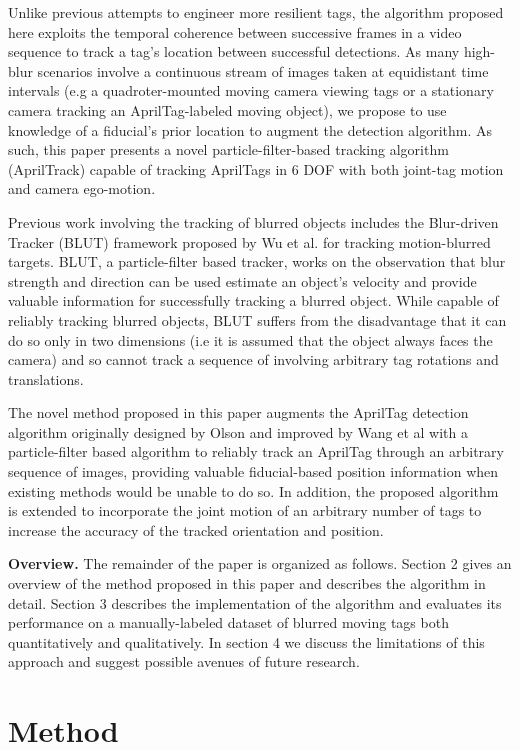 \documentclass[letterpaper, 10 pt, conference]{ieeeconf}
\begin{document}
Unlike previous attempts to engineer more resilient tags, the algorithm proposed here exploits the temporal coherence between successive frames in a video sequence to track a tag's location between successful detections. As many high-blur scenarios involve a continuous stream of images taken at equidistant time intervals (e.g a quadroter-mounted moving camera viewing tags or a stationary camera tracking an AprilTag-labeled moving object), we propose to use knowledge of a fiducial's prior location to augment the detection algorithm. As such, this paper presents a novel particle-filter-based tracking algorithm (AprilTrack) capable of tracking AprilTags in 6 DOF with both joint-tag motion and camera ego-motion.
	
Previous work involving the tracking of blurred objects includes the Blur-driven Tracker (BLUT) framework proposed by Wu et al. \citep{BLUT} for tracking motion-blurred targets. BLUT, a particle-filter based tracker, works on the observation that blur strength and direction can be used estimate an object's velocity and provide valuable information for successfully tracking a blurred object. While capable of reliably tracking blurred objects, BLUT suffers from the disadvantage that it can do so only in two dimensions (i.e it is assumed that the object always faces the camera) and so cannot track a sequence of involving arbitrary tag rotations and translations.


The novel method proposed in this paper augments the AprilTag detection algorithm originally designed by Olson \citep{AprilTag} and improved by Wang et al \citep{AprilTag_2} with a particle-filter based algorithm to reliably track an AprilTag through an arbitrary sequence of images, providing valuable fiducial-based position information when existing methods would be unable to do so. In addition, the proposed algorithm is extended to incorporate the joint motion of an arbitrary number of tags to increase the accuracy of the tracked orientation and position.


\textbf{Overview.} The remainder of the paper is organized as follows. Section 2 gives an overview of the method proposed in this paper and describes the algorithm in detail. Section 3 describes the implementation of the algorithm and evaluates its performance on a manually-labeled dataset of blurred moving tags both quantitatively and qualitatively. In section 4 we discuss the limitations of this approach and suggest possible avenues of future research.

\section{Method}
\end{document}
